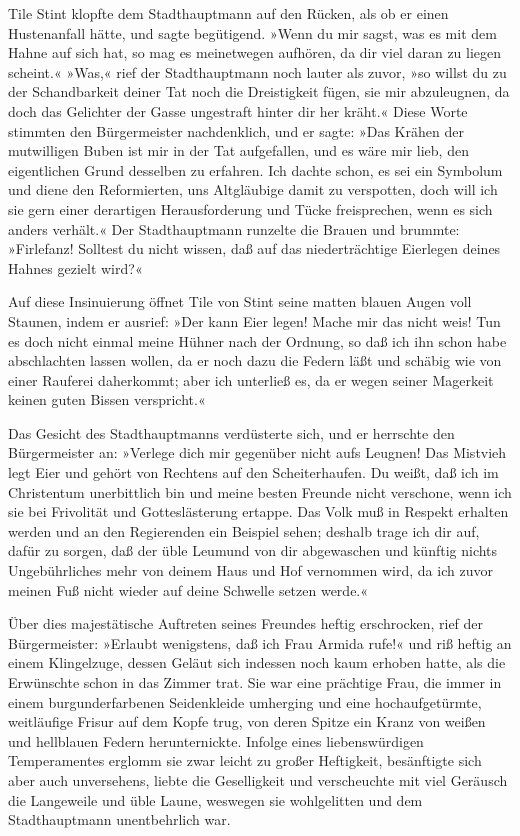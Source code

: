 Tile Stint klopfte dem Stadthauptmann auf den Rücken, als ob er
einen Hustenanfall hätte, und sagte begütigend. »Wenn du mir sagst,
was es mit dem Hahne auf sich hat, so mag es meinetwegen aufhören,
da dir viel daran zu liegen scheint.« »Was,« rief der
Stadthauptmann noch lauter als zuvor, »so willst du zu der
Schandbarkeit deiner Tat noch die Dreistigkeit fügen, sie mir
abzuleugnen, da doch das Gelichter der Gasse ungestraft hinter dir
her kräht.« Diese Worte stimmten den Bürgermeister nachdenklich,
und er sagte: »Das Krähen der mutwilligen Buben ist mir in der Tat
aufgefallen, und es wäre mir lieb, den eigentlichen Grund desselben
zu erfahren. Ich dachte schon, es sei ein Symbolum und diene den
Reformierten, uns Altgläubige damit zu verspotten, doch will ich
sie gern einer derartigen Herausforderung und Tücke freisprechen,
wenn es sich anders verhält.« Der Stadthauptmann runzelte die
Brauen und brummte: »Firlefanz! Solltest du nicht wissen, daß auf
das niederträchtige Eierlegen deines Hahnes gezielt wird?«

Auf diese Insinuierung öffnet Tile von Stint seine matten blauen
Augen voll Staunen, indem er ausrief:\pagenum{[11]} »Der kann Eier
legen! Mache mir das nicht weis! Tun es doch nicht einmal meine
Hühner nach der Ordnung, so daß ich ihn schon habe abschlachten
lassen wollen, da er noch dazu die Federn läßt und schäbig wie von
einer Rauferei daherkommt; aber ich unterließ es, da er wegen
seiner Magerkeit keinen guten Bissen verspricht.«

Das Gesicht des Stadthauptmanns verdüsterte sich, und er herrschte
den Bürgermeister an: »Verlege dich mir gegenüber nicht aufs
Leugnen! Das Mistvieh legt Eier und gehört von Rechtens auf den
Scheiterhaufen. Du weißt, daß ich im Christentum unerbittlich bin
und meine besten Freunde nicht verschone, wenn ich sie bei
Frivolität und Gotteslästerung ertappe. Das Volk muß in Respekt
erhalten werden und an den Regierenden ein Beispiel sehen; deshalb
trage ich dir auf, dafür zu sorgen, daß der üble Leumund von dir
abgewaschen und künftig nichts Ungebührliches mehr von deinem Haus
und Hof vernommen wird, da ich zuvor meinen Fuß nicht wieder auf
deine Schwelle setzen werde.«

Über dies majestätische Auftreten seines Freundes heftig
erschrocken, rief der Bürgermeister: »Erlaubt wenigstens, daß ich
Frau Armida rufe!« und riß heftig an einem Klingelzuge, dessen
Geläut sich indessen noch kaum erhoben hatte, als die Erwünschte
schon in das Zimmer trat. Sie war eine prächtige Frau, die immer in
einem burgunderfarbenen Seidenkleide umherging und eine
hochaufgetürmte, weitläufige Frisur auf dem Kopfe trug, von deren
Spitze ein Kranz von weißen und hellblauen Federn herunternickte.
Infolge eines liebenswürdigen Temperamentes erglomm sie zwar leicht
zu großer Heftigkeit, besänftigte sich aber auch unversehens,
liebte die Geselligkeit und verscheuchte mit viel Geräusch die
\pagenum{[12]}Langeweile und üble Laune, weswegen sie wohlgelitten
und dem Stadthauptmann unentbehrlich war.

